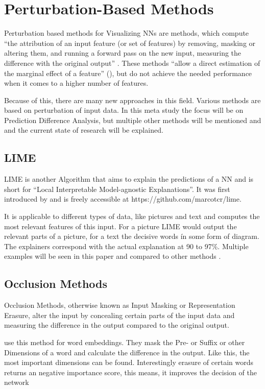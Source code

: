 \section{Perturbation-Based Methods}
Perturbation based methods for Visualizing NNs are methods, which compute “the attribution of an input feature (or set of features) by removing, masking or altering them, and running a forward pass on the new input, measuring the difference with the original output” \cite[2]{Acona.2018}.
These methods “allow a direct estimation of the marginal effect of a feature” (\cite[p.2]{Acona.2018}), but do not achieve the needed performance when it comes to a higher number of features.
\par
Because of this, there are many new approaches in this field.
Various methods are based on perturbation of input data. In this meta study the focus will be on Prediction Difference Analysis, but multiple other methods will be mentioned and and the current state of research will be explained.


\subsection{LIME}
LIME is another Algorithm that aims to explain the predictions of a NN and is short for “Local Interpretable Model-agnostic Explanations”. It was first introduced by  and is freely accessible at https://github.com/marcotcr/lime.
\par
It is applicable to different types of data, like pictures and text and computes the most relevant features of this input. For a picture LIME would output the relevant parts of a picture, for a text the decisive words ín some form of diagram. The explainers correspond with the actual explanation at 90 to 97\%. Multiple examples will be seen in this paper and compared to other methods \cite{Ribeiro.2016}.

\subsection{Occlusion Methods}
Occlusion Methods, otherwise known as Input Masking or Representation Erasure, alter the input by concealing certain parts of the input data and measuring the difference in the output compared to the original output. 
\par
{} use this method for word embeddings. They mask the Pre- or Suffix or other Dimensions of a word and calculate the difference in the output. Like this, the most important dimensions can be found. Interestingly erasure of certain words returns an negative importance score, this means, it improves the decision of the network

